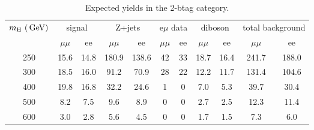 \begin{table}[h!]
\caption{Expected yields in the 2-btag category.}
\label{table:windowYields2tag}
\centering
\begin{tabular}{|c|c|c|c|c|c|c|c|c|c|c|} \hline
    $m_{\mathrm{H}}~(\,\text{Ge\hspace{-.08em}V})$   & \multicolumn{2}{c|}{signal}      & \multicolumn{2}{c|}{Z+jets} & \multicolumn{2}{c|}{e$\mu$ data} & \multicolumn{2}{c|}{diboson} & \multicolumn{2}{c|}{total background} \\ \cline{2-11}
                 & $\mu\mu$ & ee &  $\mu\mu$ &  ee &  $\mu\mu$ &  ee &  $\mu\mu$ &  ee & $\mu\mu$ & ee \\\hline
    250&15.6 & 14.8 &180.9 & 138.6 &42 & 33  &18.7 & 16.4 &241.7 & 188.0 \\
    300&18.5 & 16.0 &91.2 & 70.9 &28 & 22  &12.2 & 11.7 &131.4 & 104.6 \\
    400&19.8 & 16.8 &32.2 & 24.6 &1 & 0  &7.0 & 5.3 &39.7 & 30.4 \\
    500&8.2 & 7.5 &9.6 & 8.9 &0 & 0  &2.7 & 2.5 &12.3 & 11.4 \\
    600&3.0 & 2.8 &5.6 & 4.5 &0 & 0  &1.7 & 1.5 &7.3 & 6.0 \\\hline
\end{tabular}
\end{table}
